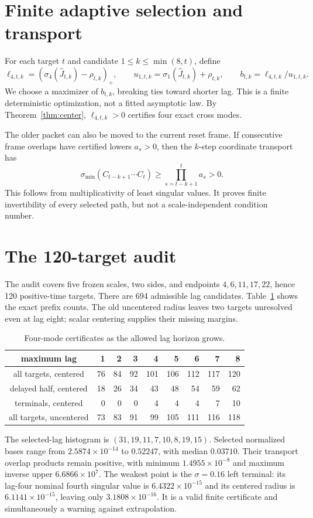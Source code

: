\documentclass[12pt]{article}
\newcommand{\smin}{\sigma_{\min}}
\begin{document}
\section{Finite adaptive selection and transport}
For each target $t$ and candidate $1\leq k\leq\min(8,t)$, define
\[
 \ell_{4,t,k}=(\sigma_4(\widehat J_{t,k})-\rho_{t,k})_+,
 \qquad
 u_{1,t,k}=\sigma_1(\widehat J_{t,k})+\rho_{t,k},
 \qquad b_{t,k}=\ell_{4,t,k}/u_{1,t,k}.
\]
We choose a maximizer of $b_{t,k}$, breaking ties toward shorter lag.  This is
a finite deterministic optimization, not a fitted asymptotic law.  By
Theorem~\ref{thm:center}, $\ell_{4,t,k}>0$ certifies four exact cross modes.

The older packet can also be moved to the current reset frame.  If consecutive
frame overlaps have certified lowers $a_s>0$, then the $k$-step coordinate
transport has
\[
 \smin(C_{t-k+1}\cdots C_t)\geq\prod_{s=t-k+1}^{t}a_s>0.
\]
This follows from multiplicativity of least singular values.  It proves finite
invertibility of every selected path, but not a scale-independent condition
number.

\section{The 120-target audit}
The audit covers five frozen scales, two sides, and endpoints
$4,6,11,17,22$, hence 120 positive-time targets.  There are 694 admissible
lag candidates.  Table~\ref{tab:horizons} shows the exact prefix counts.
The old uncentered radius leaves two targets unresolved even at lag eight;
scalar centering supplies their missing margins.

\begin{table}[h]
\centering
\small
\begin{tabular}{c@{\quad}rrrrrrrr}
\toprule
maximum lag &1&2&3&4&5&6&7&8\\
\midrule
all targets, centered&76&84&92&101&106&112&117&120\\
delayed half, centered&18&26&34&43&48&54&59&62\\
terminals, centered&0&0&0&4&4&4&7&10\\
all targets, uncentered&73&83&91&99&105&111&116&118\\
\bottomrule
\end{tabular}
\caption{Four-mode certificates as the allowed lag horizon grows.}
\label{tab:horizons}
\end{table}

The selected-lag histogram is
$(31,19,11,7,10,8,19,15)$.  Selected normalized bases range from
$2.5874\times10^{-14}$ to $0.52247$, with median $0.03710$.  Their transport
overlap products remain positive, with minimum $1.4955\times10^{-8}$ and
maximum inverse upper $6.6866\times10^7$.  The weakest point is the
$\sigma=0.16$ left terminal: its lag-four nominal fourth singular value is
$6.4322\times10^{-15}$ and its centered radius is
$6.1141\times10^{-15}$, leaving only $3.1808\times10^{-16}$.  It is a valid
finite certificate and simultaneously a warning against extrapolation.
\end{document}
